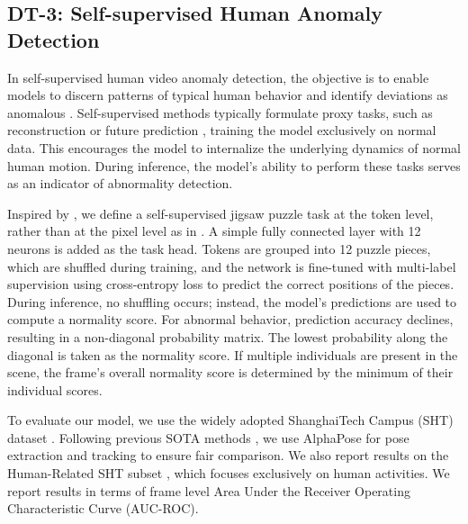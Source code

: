 % 


\subsection{DT-3: Self-supervised Human Anomaly Detection}
\label{sec:sht}
In self-supervised human video anomaly detection, the objective is to enable models to discern patterns of typical human behavior and identify deviations as anomalous \cite{10.1145/3645101}. Self-supervised methods typically formulate proxy tasks, such as reconstruction \cite{morais2019learning} or future prediction \cite{morais2019learning, rodrigues2020multi, zeng2021hierarchical}, training the model exclusively on normal data. This encourages the model to internalize the underlying dynamics of normal human motion. During inference, the model's ability to perform these tasks serves as an indicator of abnormality detection.



Inspired by \cite{jigsaw}, we define a self-supervised jigsaw puzzle task at the token level, rather than at the pixel level as in \cite{jigsaw}. A simple fully connected layer with 12 neurons is added as the task head. Tokens are grouped into 12 puzzle pieces, which are shuffled during training, and the network is fine-tuned with multi-label supervision using cross-entropy loss to predict the correct positions of the pieces. During inference, no shuffling occurs; instead, the model's predictions are used to compute a normality score. For abnormal behavior, prediction accuracy declines, resulting in a non-diagonal probability matrix. The lowest probability along the diagonal is taken as the normality score. If multiple individuals are present in the scene, the frame’s overall normality score is determined by the minimum of their individual scores.

To evaluate our model, we use the widely adopted ShanghaiTech Campus (SHT) dataset \cite{liu2018future}. Following previous SOTA methods \citep{markovitz2020graph, hirschorn2023normalizing, yu2023regularity}, we use AlphaPose \citep{li2019crowdpose} for pose extraction and tracking to ensure fair comparison. We also report results on the Human-Related SHT subset \cite{morais2019learning}, which focuses exclusively on human activities. We report results in terms of frame level Area Under the Receiver Operating Characteristic Curve (AUC-ROC). 

